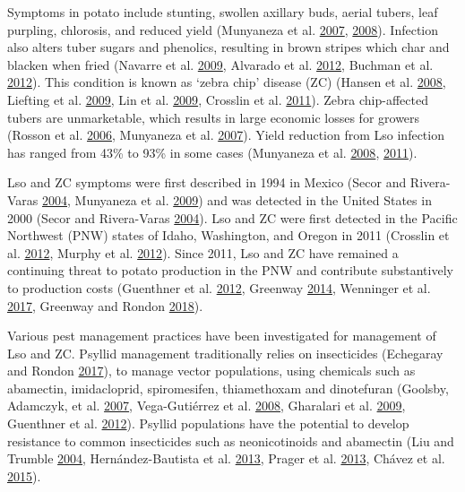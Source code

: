 \documentclass[]{article}
\begin{document}
Symptoms in potato include stunting, swollen axillary buds, aerial
tubers, leaf purpling, chlorosis, and reduced yield (Munyaneza et al.
\protect\hyperlink{ref-Munyaneza2007a}{2007},
\protect\hyperlink{ref-Munyaneza2008}{2008}). Infection also alters
tuber sugars and phenolics, resulting in brown stripes which char and
blacken when fried (Navarre et al.
\protect\hyperlink{ref-Navarre2009}{2009}, Alvarado et al.
\protect\hyperlink{ref-Alvarado2012}{2012}, Buchman et al.
\protect\hyperlink{ref-Buchman2012}{2012}). This condition is known as
`zebra chip' disease (ZC) (Hansen et al.
\protect\hyperlink{ref-Hansen2008}{2008}, Liefting et al.
\protect\hyperlink{ref-Liefting2009}{2009}, Lin et al.
\protect\hyperlink{ref-Lin2009}{2009}, Crosslin et al.
\protect\hyperlink{ref-Crosslin2011}{2011}). Zebra chip-affected tubers
are unmarketable, which results in large economic losses for growers
(Rosson et al. \protect\hyperlink{ref-Rosson2006}{2006}, Munyaneza et
al. \protect\hyperlink{ref-Munyaneza2007a}{2007}). Yield reduction from
Lso infection has ranged from 43\% to 93\% in some cases (Munyaneza et
al. \protect\hyperlink{ref-Munyaneza2008}{2008},
\protect\hyperlink{ref-Munyaneza2011}{2011}).

Lso and ZC symptoms were first described in 1994 in Mexico (Secor and
Rivera-Varas \protect\hyperlink{ref-Secor2004}{2004}, Munyaneza et al.
\protect\hyperlink{ref-Munyaneza2009}{2009}) and was detected in the
United States in 2000 (Secor and Rivera-Varas
\protect\hyperlink{ref-Secor2004}{2004}). Lso and ZC were first detected
in the Pacific Northwest (PNW) states of Idaho, Washington, and Oregon
in 2011 (Crosslin et al. \protect\hyperlink{ref-Crosslin2012}{2012},
Murphy et al. \protect\hyperlink{ref-Murphy2012}{2012}). Since 2011, Lso
and ZC have remained a continuing threat to potato production in the PNW
and contribute substantively to production costs (Guenthner et al.
\protect\hyperlink{ref-Guenthner2012}{2012}, Greenway
\protect\hyperlink{ref-Greenway2014}{2014}, Wenninger et al.
\protect\hyperlink{ref-Wenninger2017}{2017}, Greenway and Rondon
\protect\hyperlink{ref-Greenway2018}{2018}).

Various pest management practices have been investigated for management
of Lso and ZC. Psyllid management traditionally relies on insecticides
(Echegaray and Rondon \protect\hyperlink{ref-Echegaray2017}{2017}), to
manage vector populations, using chemicals such as abamectin,
imidacloprid, spiromesifen, thiamethoxam and dinotefuran (Goolsby,
Adamczyk, et al. \protect\hyperlink{ref-Goolsby2007b}{2007},
Vega-Gutiérrez et al. \protect\hyperlink{ref-Vega-Gutierrez2008}{2008},
Gharalari et al. \protect\hyperlink{ref-Gharalari2009}{2009}, Guenthner
et al. \protect\hyperlink{ref-Guenthner2012}{2012}). Psyllid populations
have the potential to develop resistance to common insecticides such as
neonicotinoids and abamectin (Liu and Trumble
\protect\hyperlink{ref-Liu2004}{2004}, Hernández-Bautista et al.
\protect\hyperlink{ref-Hernandez-Bautista2013}{2013}, Prager et al.
\protect\hyperlink{ref-Prager2013}{2013}, Chávez et al.
\protect\hyperlink{ref-Chavez2015}{2015}).
\end{document}
